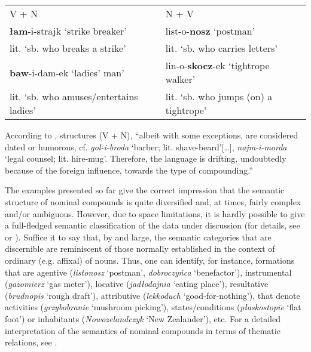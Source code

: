 \documentclass[output=paper]{LSP/langsci}
\begin{document}
\ea\label{ex:szymanek:8} 
\begin{tabularx}{\linewidth}[t]{QQ}
V + N  &         N + V\\ 
\textbf{łam}-i-strajk ‘strike breaker’ &   list-o-\textbf{nosz} ‘postman’\\
  lit. ‘sb. who breaks a strike’    &   lit. ‘sb. who carries letters’\\
\tablevspace
\textbf{baw}-i-dam-ek ‘ladies’ man’ &   lin-o-\textbf{skocz}-ek ‘tightrope walker’\\
  lit. ‘sb. who amuses/entertains ladies’    & lit. ‘sb. who jumps (on) a tightrope’\\
  \end{tabularx}
\z 

{According to \citet{Nagórko2016},  structures (V + N), “albeit with some exceptions, are considered dated or humorous, cf.} {\textit{gol-i-broda}} {‘barber; lit. shave-beard’[…],} {\textit{najm-i-morda}} {‘legal counsel; lit. hire-mug’. Therefore, the  language is drifting, undoubtedly because of the foreign influence, towards the  type of compounding.”}

{The examples presented so far give the correct impression that the semantic structure of  nominal compounds is quite diversified and, at times, fairly complex and/or ambiguous. However, due to space limitations, it is hardly possible to give a full-fledged semantic classification of the data under discussion (for details, see \citealt{Kurzowa1976} or \citealt{GrzegorczykowaPuzynina1999}). Suffice it to say that, by and large, the semantic categories that are discernible are reminiscent of those normally established in the context of ordinary (e.g. affixal)  of  nouns. Thus, one can identify, for instance, formations that are agentive (}{\textit{listonosz}} {‘postman’,} {\textit{dobroczyńca}} {‘benefactor’), instrumental (}{\textit{gazomierz}} {‘gas meter’), locative (}{\textit{jadłodajnia}} {‘eating place’), resultative (}{\textit{brudnopis}} {‘rough draft’), attributive (}{\textit{lekkoduch}} {‘good-for-nothing’), that denote activities (}{\textit{grzybobranie}} {‘mushroom picking’), states/conditions (}{\textit{płaskostopie}} {‘flat foot’) or inhabitants (}{\textit{Nowozelandczyk}} {‘New Zealander’), etc. For a detailed interpretation of the semantics of  nominal compounds in terms of thematic relations, see \citet{Sambor1976}.}
\end{document}
